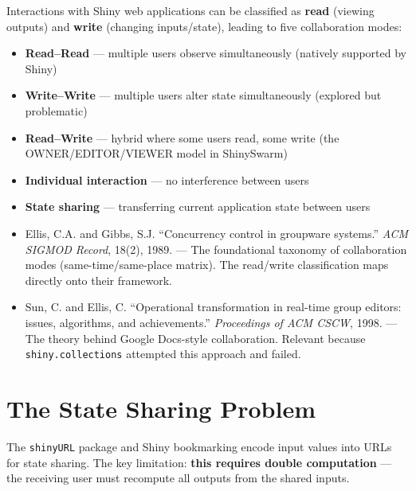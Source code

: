 \documentclass[12pt,a4paper]{article}
\begin{document}
Interactions with Shiny web applications can be classified as \textbf{read} (viewing outputs) and \textbf{write} (changing inputs/state), leading to five collaboration modes:

\begin{itemize}[nosep]
  \item \textbf{Read--Read} --- multiple users observe simultaneously (natively supported by Shiny)
  \item \textbf{Write--Write} --- multiple users alter state simultaneously (explored but problematic)
  \item \textbf{Read--Write} --- hybrid where some users read, some write (the OWNER/EDITOR/VIEWER model in ShinySwarm)
  \item \textbf{Individual interaction} --- no interference between users
  \item \textbf{State sharing} --- transferring current application state between users
\end{itemize}

\begin{addedsource}
\begin{itemize}[nosep]
  \item Ellis, C.A. and Gibbs, S.J. ``Concurrency control in groupware systems.'' \textit{ACM SIGMOD Record}, 18(2), 1989. --- The foundational taxonomy of collaboration modes (same-time/same-place matrix). The read/write classification maps directly onto their framework.
  \item Sun, C. and Ellis, C. ``Operational transformation in real-time group editors: issues, algorithms, and achievements.'' \textit{Proceedings of ACM CSCW}, 1998. --- The theory behind Google Docs-style collaboration. Relevant because \texttt{shiny.collections} attempted this approach and failed.
\end{itemize}
\end{addedsource}

\section{The State Sharing Problem}

The \texttt{shinyURL} package \cite{aerts2015} and Shiny bookmarking \cite{shinybookmark} encode input values into URLs for state sharing. The key limitation: \textbf{this requires double computation} --- the receiving user must recompute all outputs from the shared inputs.
\end{document}

